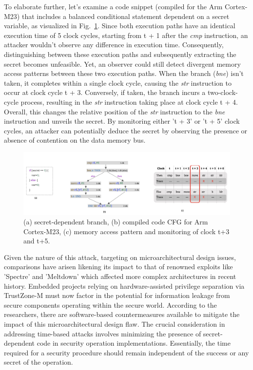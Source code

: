 To elaborate further, let's examine a code snippet (compiled for the Arm
Cortex-M23) that includes a balanced conditional statement dependent on a
secret variable, as visualized in Fig.~\ref{fig:busted}. Since both
execution paths have an identical execution time of 5 clock cycles,
starting from t + 1 after the \textit{cmp} instruction, an attacker
wouldn't observe any difference in execution time. Consequently,
distinguishing between these execution paths and subsequently extracting
the secret becomes unfeasible. Yet, an observer could still detect
divergent memory access patterns between these two execution paths. When
the branch (\textit{bne}) isn't taken, it completes within a single clock
cycle, causing the \textit{str} instruction to occur at clock cycle t + 3.
Conversely, if taken, the branch incurs a two-clock-cycle process,
resulting in the \textit{str} instruction taking place at clock cycle t +
4. Overall, this changes the relative position of the \textit{str}
instruction to the \textit{bne} instruction and unveils the secret. By
monitoring either 't + 3' or 't + 5' clock cycles, an attacker can
potentially deduce the secret by observing the presence or absence of
contention on the data memory bus.

\begin{figure}
  \centering
  \includegraphics[width=\textwidth]{figures/busted.jpg}
  \caption{(a) secret-dependent branch, (b) compiled code CFG for Arm Cortex-M23, (c) memory access pattern and monitoring of clock t+3 and t+5.}
  \label{fig:busted}
\end{figure}

Given the nature of this attack, targeting on microarchitectural design
issues, comparisons have arisen likening its impact to that of renowned
exploits like 'Spectre' and 'Meltdown' which affected more complex
architectures in recent history. Embedded projects relying on
hardware-assisted privilege separation via TrustZone-M must now factor in
the potential for information leakage from secure components operating
within the secure world. According to the researchers, there are
software-based countermeasures available to mitigate the impact of this
microarchitectural design flaw. The crucial consideration in addressing
time-based attacks involves minimizing the presence of secret-dependent
code in security operation implementations. Essentially, the time required
for a security procedure should remain independent of the success or any
secret of the operation.

